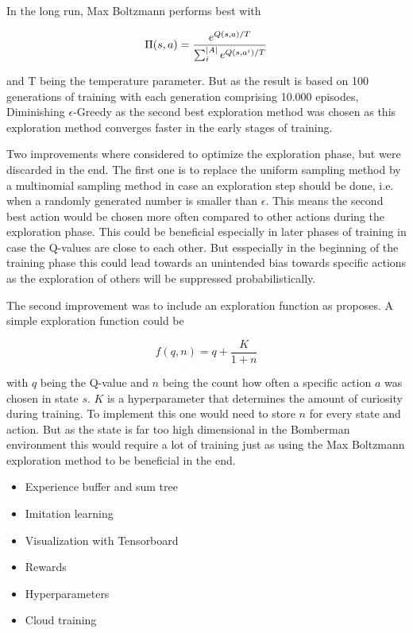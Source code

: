 In the long run, Max Boltzmann performs best with 

\begin{equation}
	\Pi(s,a) = \frac{e^{Q(s,a)/T}}{\sum_i^{\lvert A\rvert}e^{Q(s,a^i)/T}}
\end{equation}

and T being the temperature parameter. But as the result is based on 100 generations of training with each generation comprising 10.000 episodes, Diminishing $\epsilon$-Greedy as the second best exploration method was chosen as this exploration method converges faster in the early stages of training.

Two improvements where considered to optimize the exploration phase, but were discarded in the end. The first one is to replace the uniform sampling method by a multinomial sampling method in case an exploration step should be done, i.e. when a randomly generated number is smaller than $\epsilon$. This means the second best action would be chosen more often compared to other actions during the exploration phase. This could be beneficial especially in later phases of training in case the Q-values are close to each other. But esspecially in the beginning of the training phase this could lead towards an unintended bias towards specific actions as the exploration of others will be suppressed probabilistically.

The second improvement was to include an exploration function as \cite{Geron2018} proposes. A simple exploration function could be 

\begin{equation}
	f(q,n) = q + \frac{K}{1+n}
\end{equation}

with $q$ being the Q-value and $n$ being the count how often a specific action $a$ was chosen in state $s$. $K$ is a hyperparameter that determines the amount of curiosity during training. To implement this one would need to store $n$ for every state and action. But as the state is far too high dimensional in the Bomberman environment this would require a lot of training just as using the Max Boltzmann exploration method to be beneficial in the end. 

\begin{itemize}
	\item Experience buffer and sum tree
	\item Imitation learning
	\item Visualization with Tensorboard
	\item Rewards
	\item Hyperparameters
	\item Cloud training
\end{itemize}

